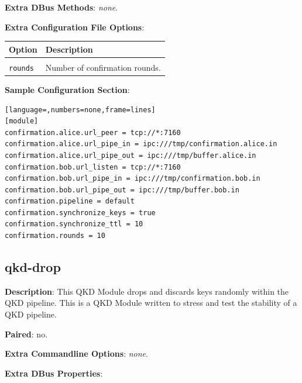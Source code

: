 \bigskip

\noindent \textbf{Extra DBus Methods}: \emph{none}.

\bigskip

\noindent \textbf{Extra Configuration File Options}:

\medskip

\begin{tabular}{lp{9cm}}

Option                      & Description \\
\hline
\\
\texttt{rounds}             & Number of confirmation rounds. \\ [0.5em]

\end{tabular}

\bigskip

\noindent \textbf{Sample Configuration Section}: 

\medskip

\begin{lstlisting}[language=,numbers=none,frame=lines]
[module]
confirmation.alice.url_peer = tcp://*:7160
confirmation.alice.url_pipe_in = ipc:///tmp/confirmation.alice.in
confirmation.alice.url_pipe_out = ipc:///tmp/buffer.alice.in
confirmation.bob.url_listen = tcp://*:7160
confirmation.bob.url_pipe_in = ipc:///tmp/confirmation.bob.in
confirmation.bob.url_pipe_out = ipc:///tmp/buffer.bob.in
confirmation.pipeline = default
confirmation.synchronize_keys = true
confirmation.synchronize_ttl = 10
confirmation.rounds = 10
\end{lstlisting}

\clearpage


\subsection{qkd-drop}
\label{subsec:qkd-drop}

\textbf{Description}: This QKD Module drops and discards keys randomly within the QKD pipeline. This is a QKD Module written to stress and test the stability of a QKD pipeline.

\bigskip

\noindent \textbf{Paired}: no.

\bigskip

\noindent \textbf{Extra Commandline Options}: \emph{none}.

\bigskip

\noindent \textbf{Extra DBus Properties}:

